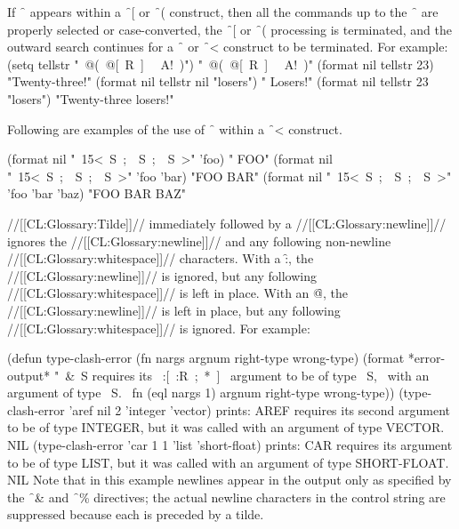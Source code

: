 If \f{~{\hat}}                                           appears within a \f{~[} or \f{~(} construct, then all the commands up to the \f{~{\hat}} are properly selected or case-converted,                    the \f{~[} or \f{~(} processing is terminated, and the outward search continues          for a \f{~\lbr  } or \f{~<} construct to be terminated.  For example:
                             \code
 (setq tellstr "~@(~@[~R~]~{\hat} ~A!~)") \EV "~@(~@[~R~]~{\hat} ~A!~)"
 (format nil tellstr 23) \EV "Twenty-three!"
 (format nil tellstr nil "losers") \EV " Losers!"
 (format nil tellstr 23 "losers") \EV "Twenty-three losers!" \endcode

Following are examples of the use of \f{~{\hat}}  within a \f{~<} construct.

\code
 (format nil "~15<~S~;~{\hat}~S~;~{\hat}~S~>" 'foo) \EV  "            FOO"
 (format nil "~15<~S~;~{\hat}~S~;~{\hat}~S~>" 'foo 'bar) \EV  "FOO         BAR"
 (format nil "~15<~S~;~{\hat}~S~;~{\hat}~S~>" 'foo 'bar 'baz) \EV  "FOO   BAR   BAZ" \endcode

\endsubsubsection%

 

//[[CL:Glossary:Tilde]]// immediately followed by a //[[CL:Glossary:newline]]// ignores the //[[CL:Glossary:newline]]// and any following non-newline //[[CL:Glossary:whitespace]]// characters. With a \f{:},
 the //[[CL:Glossary:newline]]// is ignored, 
 but any following //[[CL:Glossary:whitespace]]// is left in place. With an \f{@},
 the //[[CL:Glossary:newline]]// is left in place,
 but any following //[[CL:Glossary:whitespace]]// is ignored. For example:

\code
 (defun type-clash-error (fn nargs argnum right-type wrong-type)
   (format *error-output*
           "~&~S requires its ~:[~:R~;~*~]~ 
           argument to be of type ~S,~%
           with an argument of type ~S.~%
           fn (eql nargs 1) argnum right-type wrong-type))
 (type-clash-error 'aref nil 2 'integer 'vector)  prints: AREF requires its second argument to be of type INTEGER, but it was called with an argument of type VECTOR. NIL
 (type-clash-error 'car 1 1 'list 'short-float)  prints: CAR requires its argument to be of type LIST, but it was called with an argument of type SHORT-FLOAT. NIL \endcode Note that in this example newlines appear in the output only as specified by the \f{~\&} and \f{~\%} directives; the  actual newline characters in the control string are suppressed because each is preceded by a tilde.
                                                                      \endsubsubsection%

